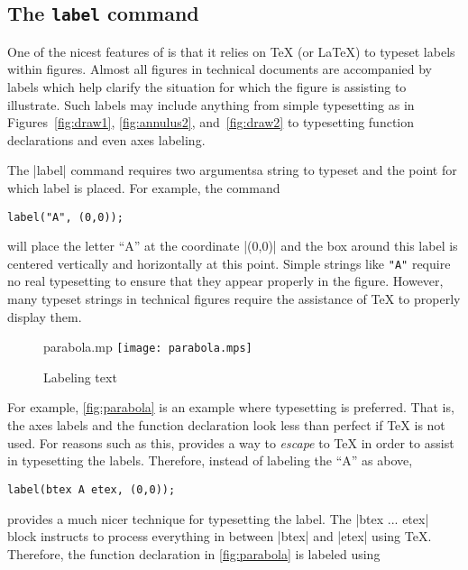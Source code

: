 \subsection{The \texttt{label} command}

One of the nicest features of \MP{} is that it relies on \TeX{} (or
\LaTeX) to typeset labels within figures.  Almost all figures in
technical documents are accompanied by labels which help clarify the
situation for which the figure is assisting to illustrate.  Such labels
may include anything from simple typesetting as in
Figures~\ref{fig:draw1}, \ref{fig:annulus2}, and~\ref{fig:draw2} to
typesetting function declarations and even axes labeling.

The |label| command requires two arguments\Dash a string to typeset and
the point for which label is placed.  For example, the command

\begin{lstlisting}[style=MP]
label("A", (0,0));
\end{lstlisting}
will place the letter ``A'' at the coordinate |(0,0)| and the box around
this label is centered vertically and horizontally at this point.
Simple strings like \lstinline[style=text]{"A"} require no real
typesetting to ensure that they appear properly in the figure.  However,
many typeset strings in technical figures require the assistance of
\TeX{} to properly display them.

\begin{figure}
  \begin{withattachment}{parabola.mp}
    \centering
    \texttt{[image: parabola.mps]}
  \end{withattachment}
  \caption{Labeling text}
  \label{fig:parabola}
\end{figure}

For example, \autoref{fig:parabola} is an example where typesetting is
preferred.  That is, the axes labels and the function declaration look
less than perfect if \TeX{} is not used.  For reasons such as this,
\MP{} provides a way to \textit{escape} to \TeX{} in order to assist in
typesetting the labels.  Therefore, instead of labeling the ``A'' as
above,

\begin{lstlisting}[style=MP]
label(btex A etex, (0,0));
\end{lstlisting}
provides a much nicer technique for typesetting the label.  The
|btex ... etex| block instructs \MP{} to process everything in between
|btex| and |etex| using \TeX.  Therefore, the function declaration in
\autoref{fig:parabola} is labeled using

